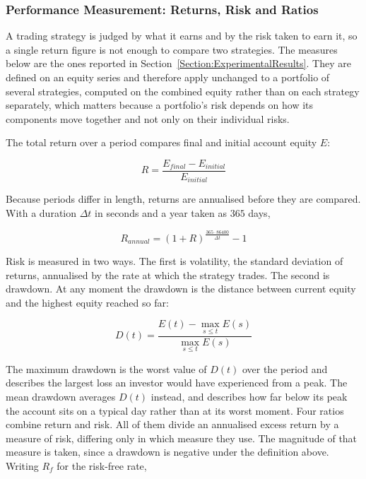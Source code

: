 \subsubsection{Performance Measurement: Returns, Risk and Ratios}
\label{Subsection:PerformanceMeasurement}

A trading strategy is judged by what it earns and by the risk taken to earn it, so a single return figure is not enough to compare two strategies. The measures below are the ones reported in Section~\ref{Section:ExperimentalResults}. They are defined on an equity series and therefore apply unchanged to a portfolio of several strategies, computed on the combined equity rather than on each strategy separately, which matters because a portfolio's risk depends on how its components move together and not only on their individual risks.

The total return over a period compares final and initial account equity $E$:

\begin{equation}
R = \frac{E_{final} - E_{initial}}{E_{initial}}
\end{equation}

Because periods differ in length, returns are annualised before they are compared. With a duration $\Delta t$ in seconds and a year taken as $365$ days,

\begin{equation}
R_{annual} = (1 + R)^{\frac{365 \cdot 86400}{\Delta t}} - 1
\label{Equation:AnnualizedReturn}
\end{equation}

Risk is measured in two ways. The first is volatility, the standard deviation of returns, annualised by the rate at which the strategy trades. The second is drawdown. At any moment the drawdown is the distance between current equity and the highest equity reached so far:

\begin{equation}
D(t) = \frac{E(t) - \max_{s \leq t} E(s)}{\max_{s \leq t} E(s)}
\label{Equation:Drawdown}
\end{equation}

The maximum drawdown is the worst value of $D(t)$ over the period and describes the largest loss an investor would have experienced from a peak. The mean drawdown averages $D(t)$ instead, and describes how far below its peak the account sits on a typical day rather than at its worst moment. Four ratios combine return and risk. All of them divide an annualised excess return by a measure of risk, differing only in which measure they use. The magnitude of that measure is taken, since a drawdown is negative under the definition above. Writing $R_f$ for the risk-free rate,


